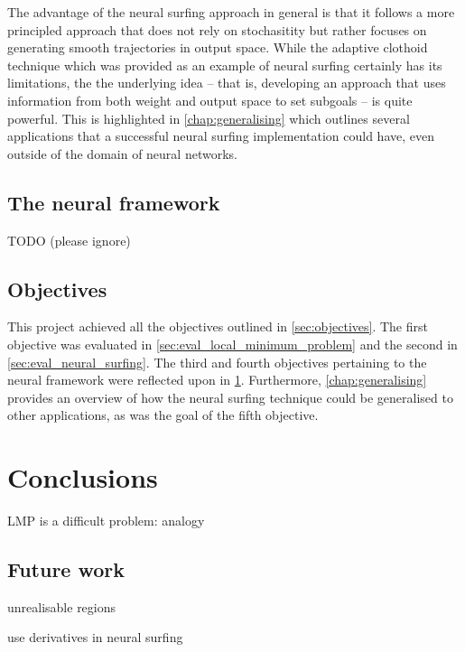 The advantage of the neural surfing approach in general is that it follows a more principled approach that does not rely on stochasitity but rather focuses on generating smooth trajectories in output space.
While the adaptive clothoid technique which was provided as an example of neural surfing certainly has its limitations, the the underlying idea -- that is, developing an approach that uses information from both weight and output space to set subgoals -- is quite powerful.
This is highlighted in \ref{chap:generalising} which outlines several applications that a successful neural surfing implementation could have, even outside of the domain of neural networks.

\section{The neural framework}
\label{sec:eval_neural_framework}
TODO (please ignore)





\section{Objectives}
This project achieved all the objectives outlined in \ref{sec:objectives}. 
The first objective was evaluated in \ref{sec:eval_local_minimum_problem} and the second in \ref{sec:eval_neural_surfing}.
The third and fourth objectives pertaining to the neural framework were reflected upon in \ref{sec:eval_neural_framework}.
Furthermore, \ref{chap:generalising} provides an overview of how the neural surfing technique could be generalised to other applications, as was the goal of the fifth objective.

\chapter{Conclusions}
LMP is a difficult problem: analogy

\section{Future work}
\label{sec:future_work}
unrealisable regions

use derivatives in neural surfing
